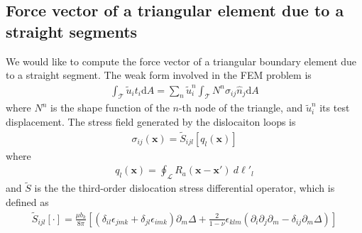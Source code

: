 \subsection{Force vector of a triangular element due to a straight segments}
We would like to compute the force vector of a triangular boundary element due to a straight segment. The weak form involved in the FEM problem is
\begin{align}
\int_\mathcal{T}\tilde u_i t_i \text{d}A=\sum_n \tilde u^n_i\int_\mathcal{T}N^n \sigma_{ij}\hat{n}_j \text{d}A
\end{align}
where $N^n$ is the shape function of the $n$-th node of the triangle, and $\tilde u^n_i$ its test displacement. 
The stress field generated by the dislocaiton loops is
\begin{align}
\sigma_{ij}(\bm x)=\tilde{S}_{ijl}\left[q_l(\bm x)\right]
\end{align}
where 
\begin{align}
q_l(\bm x)=\oint_\mathcal{L}R_a(\bm x-\bm x')\ d\ell'_l
\end{align}
and $\tilde{S}$ is the the third-order dislocation stress differential operator, which is defined as
\begin{align}
\tilde{S}_{ijl}[\cdot]=\frac{\mu b_k}{8\pi}\left[\left(\delta_{il}\epsilon_{jmk}+\delta_{jl}\epsilon_{imk}\right)\partial_m\Delta+\frac{2}{1-\nu}\epsilon_{klm}\left(\partial_{i}\partial_j\partial_m-\delta_{ij}\partial_m\Delta\right)\right]
\end{align}
